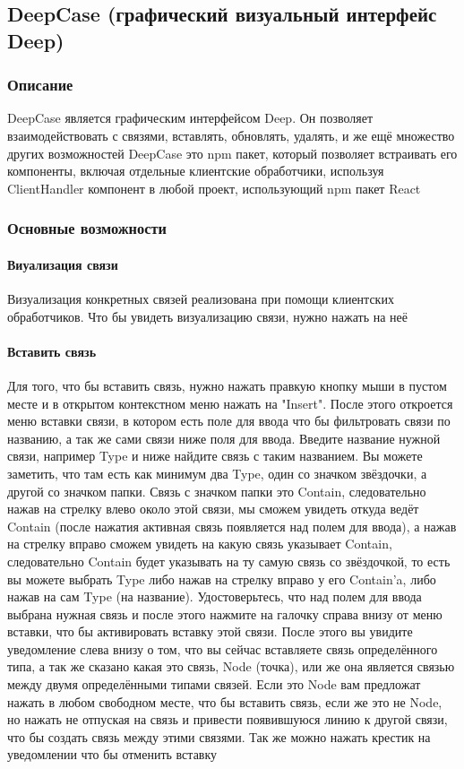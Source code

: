 \documentclass{article}
\begin{document}
\subsection{DeepCase (графический визуальный интерфейс Deep)}
\subsubsection{Описание}
DeepCase является графическим интерфейсом Deep. Он позволяет 
взаимодействовать с связями, вставлять, обновлять, удалять, и же ещё множество
других возможностей
DeepCase это npm пакет, который позволяет встраивать его компоненты, включая отдельные клиентские обработчики, используя ClientHandler компонент в любой проект, использующий npm пакет React
\subsubsection{Основные возможности}
\paragraph{Виуализация связи}
Визуализация конкретных связей реализована при помощи клиентских обработчиков. Что бы увидеть визуализацию связи, нужно нажать на неё
\paragraph{Вставить связь}
Для того, что бы вставить связь, нужно нажать правкую кнопку мыши в пустом
месте и в открытом контекстном меню нажать на "Insert". После этого откроется
меню вставки связи, в котором есть поле для ввода что бы фильтровать связи по
названию, а так же сами связи ниже поля для ввода. Введите название нужной
связи, например Type и ниже найдите связь с таким названием. Вы можете
заметить, что там есть как минимум два Type, один со значком звёздочки, а
другой со значком папки. Связь с значком папки это Contain, следовательно нажав
на стрелку влево около этой связи, мы сможем увидеть откуда ведёт Contain
(после нажатия активная связь появляется над полем для ввода), а нажав на
стрелку вправо сможем увидеть на какую связь указывает Contain, следовательно
Contain будет указывать на ту самую связь со звёздочкой, то есть вы можете
выбрать Type либо нажав на стрелку вправо у его Contain'a, либо нажав на сам
Type (на название). Удостоверьтесь, что над полем для ввода выбрана нужная
связь и после этого нажмите на галочку справа внизу от меню вставки, что бы
активировать вставку этой связи. После этого вы увидите уведомление слева внизу
о том, что вы сейчас вставляете связь определённого типа, а так же сказано
какая это связь, Node (точка), или же она является связью между двумя
определёнными типами связей. Если это Node вам предложат нажать в любом
свободном месте, что бы вставить связь, если же это не Node, но нажать не
отпуская на связь и привести появившуюся линию к другой связи, что бы создать
связь между этими связями. Так же можно нажать крестик на уведомлении что бы
отменить вставку
\end{document}
